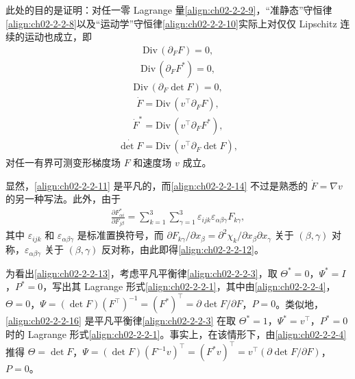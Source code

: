 ﻿\documentclass[../../main.tex]{subfiles}
\begin{document}
此处的目的是证明：对任一零 Lagrange 量\eqref{align:ch02-2-2-9}，“准静态”守恒律\eqref{align:ch02-2-2-8}以及“运动学”守恒律\eqref{align:ch02-2-2-10}实际上对仅仅 Lipschitz 连续的运动也成立，即
\begin{align}
\mathrm{Div}\,(\partial_{F}F)=0,
\label{align:ch02-2-2-11}
\end{align}
\begin{align}
\mathrm{Div}\,(\partial_{F}F^{*})=0,
\label{align:ch02-2-2-12}
\end{align}
\begin{align}
\mathrm{Div}\,(\partial_{F}\det F)=0,
\label{align:ch02-2-2-13}
\end{align}
\begin{align}
\dot{F}=\mathrm{Div}\,(v^{\top}\partial_{F}F),
\label{align:ch02-2-2-14}
\end{align}
\begin{align}
\dot{F}^{*}=\mathrm{Div}\,(v^{\top}\partial_{F}F^{*}),
\label{align:ch02-2-2-15}
\end{align}
\begin{align}
\dot{\det F}=\mathrm{Div}\,(v^{\top}\partial_{F}\det F),
\label{align:ch02-2-2-16}
\end{align}
对任一有界可测变形梯度场 $F$ 和速度场 $v$ 成立。

显然，\eqref{align:ch02-2-2-11} 是平凡的，而\eqref{align:ch02-2-2-14} 不过是熟悉的 $\dot{F}=\nabla v$ 的另一种写法。此外，由于
\begin{align}
\frac{\partial F^{*}_{\alpha i}}{\partial F_{j\beta}}=\sum_{k=1}^{3}\sum_{\gamma=1}^{3}\varepsilon_{ijk}\varepsilon_{\alpha\beta\gamma}F_{k\gamma},
\label{align:ch02-2-2-17}
\end{align}
其中 $\varepsilon_{ijk}$ 和 $\varepsilon_{\alpha\beta\gamma}$ 是标准置换符号，而 $\partial F_{k\gamma}/\partial x_{\beta}=\partial^{2}\chi_{k}/\partial x_{\beta}\partial x_{\gamma}$ 关于 $(\beta,\gamma)$ 对称，$\varepsilon_{\alpha\beta\gamma}$ 关于 $(\beta,\gamma)$ 反对称，由此即得\eqref{align:ch02-2-2-12}。

为看出\eqref{align:ch02-2-2-13}，考虑平凡平衡律\eqref{align:ch02-2-2-3}，取 $\Theta^{*}=0$，$\Psi^{*}=I$，$P^{*}=0$，写出其 Lagrange 形式\eqref{align:ch02-2-2-1}，其中由\eqref{align:ch02-2-2-4}，$\Theta=0$，$\Psi=(\det F)(F^{\top})^{-1}=(F^{*})^{\top}=\partial\det F/\partial F$，$P=0$。类似地，\eqref{align:ch02-2-2-16} 是平凡平衡律\eqref{align:ch02-2-2-3} 在取 $\Theta^{*}=1$，$\Psi^{*}=v^{\top}$，$P^{*}=0$ 时的 Lagrange 形式\eqref{align:ch02-2-2-1}。事实上，在该情形下，由\eqref{align:ch02-2-2-4} 推得 $\Theta=\det F$，$\Psi=(\det F)(F^{-1}v)^{\top}=(F^{*}v)^{\top}=v^{\top}(\partial\det F/\partial F)$，$P=0$。
\end{document}
